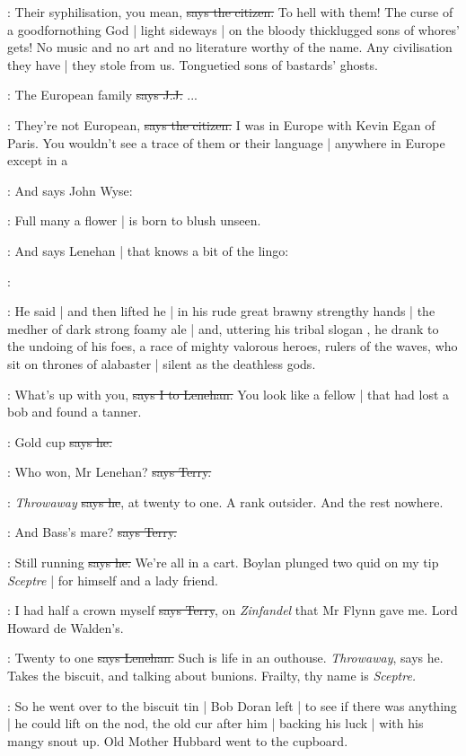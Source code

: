 \citizen:
Their syphilisation,
you mean,
\sout{says the citizen.}
To hell with them!
The curse of a goodfornothing God |
light sideways |
on the bloody thicklugged sons of whores' gets!
No music and no art and no literature worthy of the name.
Any civilisation they have |
they stole from us.
Tonguetied sons of bastards' ghosts.

\jjom:
The European family
\sout{says J.J.}
...

\citizen:
They're not European,
\sout{says the citizen.}
I was in Europe with Kevin Egan of Paris.
You wouldn't see a trace of them or their language |
anywhere in Europe except in a 

\Nq:
And says John Wyse:

\johnwyse:
Full many a flower |
is born to blush unseen.

\Nq:
And says Lenehan |
that knows a bit of the lingo:

\lenehan:

:
He said |
and then lifted he |
in his rude great brawny strengthy hands |
the medher of dark strong foamy ale |
and,
uttering his tribal slogan ,
he drank to the undoing of his foes,
a race of mighty valorous heroes,
rulers of the waves,
who sit on thrones of alabaster |
silent as the deathless gods.

:
What's up with you,
\sout{says I to Lenehan.}
You look like a fellow |
that had lost a bob and found a tanner.

\lenehan:
Gold cup
\sout{says he.}

\terry:
Who won,
Mr Lenehan?
\sout{says Terry.}

\lenehan:
\emph{Throwaway}
\sout{says he},
at twenty to one.
A rank outsider.
And the rest nowhere.%

\terry:
And Bass's mare?
\sout{says Terry.}

\lenehan:
Still running
\sout{says he.}
We're all in a cart.
Boylan plunged two quid on my tip \emph{Sceptre} |
for himself and a lady friend.

\terry:
I had half a crown myself
\sout{says Terry},
on \emph{Zinfandel}
that Mr Flynn gave me.
Lord Howard de Walden's.

\lenehan:
Twenty to one
\sout{says Lenehan.}
Such is life in an outhouse.
\emph{Throwaway},
says he.
Takes the biscuit,
and talking about bunions.
Frailty,
thy name is \emph{Sceptre.}

\Nq:
So he went over to the biscuit tin |
Bob Doran left |
to see if there was anything |
he could lift on the nod,
the old cur after him |
backing his luck |
with his mangy snout up.
Old Mother Hubbard went to the cupboard.

